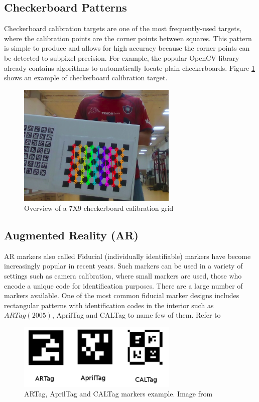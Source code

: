 \subsection{Checkerboard Patterns}

Checkerboard calibration targets are one of the most frequently-used targets, where the calibration points are the corner points between squares. This pattern is simple to produce and allows for high accuracy because the corner points can be detected to subpixel precision. For example, the popular OpenCV library already contains algorithms to automatically locate plain checkerboards. Figure \ref{fig:target1} shows an example of checkerboard calibration target.


\begin{figure}[!h]
\begin{center}
\includegraphics[width=3in]{figures03/openCV1.png}
\caption{Overview of a 7X9 checkerboard calibration grid }%
\label{fig:target1}
\end{center}
\end{figure}

\subsection{Augmented Reality (AR)}
AR markers also called Fiducial (individually identifiable) markers have become increasingly popular in recent years. Such markers can be used in a variety of settings such as camera calibration, where small markers are used, those who encode a unique code for identification purposes. There are a large number of markers available. One of the most common fiducial marker designs includes rectangular patterns with identification codes in the interior such as $ARTag (2005)$, AprilTag and CALTag to name few of them.  Refer to \cite{fiducialTargets} 


\begin{figure}[!h]
\begin{center}
\includegraphics[width=3in]{figures03/fiducials.png}
\caption{ARTag, AprilTag and CALTag markers example. Image from \cite{fiducialTargets}}%
\label{fig:fiducial}
\end{center}
\end{figure}

